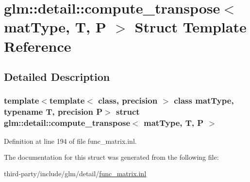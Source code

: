 \hypertarget{structglm_1_1detail_1_1compute__transpose}{}\section{glm\+:\+:detail\+:\+:compute\+\_\+transpose$<$ mat\+Type, T, P $>$ Struct Template Reference}
\label{structglm_1_1detail_1_1compute__transpose}


\subsection{Detailed Description}
\subsubsection*{template$<$template$<$ class, precision $>$ class mat\+Type, typename T, precision P$>$\newline
struct glm\+::detail\+::compute\+\_\+transpose$<$ mat\+Type, T, P $>$}



Definition at line 194 of file func\+\_\+matrix.\+inl.



The documentation for this struct was generated from the following file\+:\begin{DoxyCompactItemize}
\item 
third-\/party/include/glm/detail/\hyperlink{func__matrix_8inl}{func\+\_\+matrix.\+inl}\end{DoxyCompactItemize}
